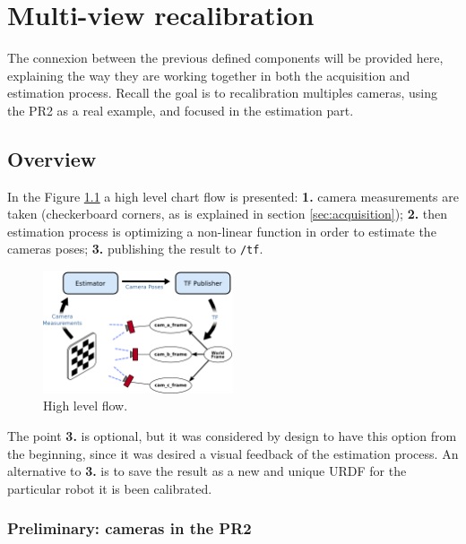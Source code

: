 \chapter{Multi-view recalibration}
\label{cha:multi-view calibration}

\vspace*{-3ex}
The connexion between the previous defined components will be provided here, explaining the way they are working together in both the acquisition and estimation process. Recall the goal is to recalibration multiples cameras, using the PR2 as a real example, and focused in the estimation part.

\section{Overview}
\label{sec:estimation_overview}

In the Figure \ref{fig:high_level_flow} a high level chart flow is presented: \textbf{1.} camera measurements are taken (checkerboard corners, as is explained in section \ref{sec:acquisition}); \textbf{2.} then estimation process is optimizing a non-linear function in order to estimate the cameras poses; \textbf{3.} publishing the result to \texttt{/tf}.

\begin{figure}[!htbp]
 \centering
 \includegraphics[width=0.5\textwidth]{images/high_level_flow_02.png}
 \caption{High level flow.}
 \label{fig:high_level_flow}
\end{figure}

The point \textbf{3.} is optional, but it was considered by design to have this option from the beginning, since it was desired a visual feedback of the estimation process. An alternative to \textbf{3.} is to save the result as a new and unique URDF for the particular robot it is been calibrated.



\subsection*{Preliminary: cameras in the PR2}

